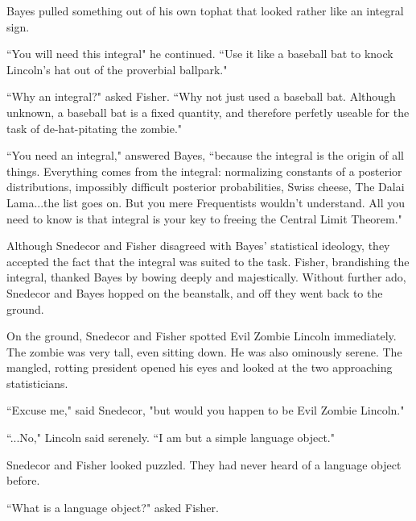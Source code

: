 \documentclass{article}
\begin{document}
Bayes pulled something out of his own tophat that looked rather like an integral sign. \newline

``You will need this integral" he continued. ``Use it like a baseball bat to knock Lincoln's hat out of the proverbial ballpark." \newline

``Why an integral?" asked Fisher. ``Why not just used a baseball bat. Although unknown, a baseball bat is a fixed quantity, and therefore perfetly useable for the task of de-hat-pitating the zombie." \newline

``You need an integral," answered Bayes, ``because the integral is the origin of all things. Everything comes from the integral: normalizing constants of a posterior distributions, impossibly difficult posterior probabilities, Swiss cheese, The Dalai Lama...the list goes on. But you mere Frequentists wouldn't understand. All you need to know is that integral is your key to freeing the Central Limit Theorem." \newline

Although Snedecor and Fisher disagreed with Bayes' statistical ideology, they accepted the fact that the integral was suited to the task. Fisher, brandishing the integral, thanked Bayes by bowing deeply and majestically. Without further ado, Snedecor and Bayes hopped on the beanstalk, and off they went back to the ground. \newline \newline


On the ground, Snedecor and Fisher spotted Evil Zombie Lincoln immediately. The zombie was very tall, even sitting down. He was also ominously serene. The mangled, rotting president opened his eyes and looked at the two approaching statisticians. \newline

``Excuse me," said Snedecor, "but would you happen to be Evil Zombie Lincoln." \newline

``...No," Lincoln said serenely. ``I am but a simple language object." \newline

Snedecor and Fisher looked puzzled. They had never heard of a language object before. \newline

``What is a language object?" asked Fisher. \newline
\end{document}
